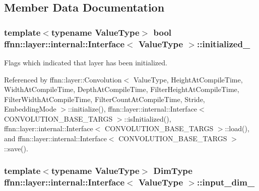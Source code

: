 \subsection{Member Data Documentation}
\hypertarget{classffnn_1_1layer_1_1internal_1_1_interface_a48c80e6608e9e20dfe2665abd55cd7ba}{
\subsubsection[{initialized\-\_\-}]{\setlength{\rightskip}{0pt plus 5cm}template$<$typename Value\-Type$>$ bool {\bf ffnn\-::layer\-::internal\-::\-Interface}$<$ Value\-Type $>$\-::initialized\-\_\-\hspace{0.3cm}{\ttfamily [protected]}}}\label{classffnn_1_1layer_1_1internal_1_1_interface_a48c80e6608e9e20dfe2665abd55cd7ba}


Flags which indicated that layer has been initialized. 



Referenced by ffnn\-::layer\-::\-Convolution$<$ Value\-Type, Height\-At\-Compile\-Time, Width\-At\-Compile\-Time, Depth\-At\-Compile\-Time, Filter\-Height\-At\-Compile\-Time, Filter\-Width\-At\-Compile\-Time, Filter\-Count\-At\-Compile\-Time, Stride, Embedding\-Mode $>$\-::initialize(), ffnn\-::layer\-::internal\-::\-Interface$<$ C\-O\-N\-V\-O\-L\-U\-T\-I\-O\-N\-\_\-\-B\-A\-S\-E\-\_\-\-T\-A\-R\-G\-S $>$\-::is\-Initialized(), ffnn\-::layer\-::internal\-::\-Interface$<$ C\-O\-N\-V\-O\-L\-U\-T\-I\-O\-N\-\_\-\-B\-A\-S\-E\-\_\-\-T\-A\-R\-G\-S $>$\-::load(), and ffnn\-::layer\-::internal\-::\-Interface$<$ C\-O\-N\-V\-O\-L\-U\-T\-I\-O\-N\-\_\-\-B\-A\-S\-E\-\_\-\-T\-A\-R\-G\-S $>$\-::save().

\hypertarget{classffnn_1_1layer_1_1internal_1_1_interface_aa011c369e00d2b78a87b94904e596f15}{
\subsubsection[{input\-\_\-dim\-\_\-}]{\setlength{\rightskip}{0pt plus 5cm}template$<$typename Value\-Type$>$ {\bf Dim\-Type} {\bf ffnn\-::layer\-::internal\-::\-Interface}$<$ Value\-Type $>$\-::input\-\_\-dim\-\_\-\hspace{0.3cm}{\ttfamily [protected]}}}\label{classffnn_1_1layer_1_1internal_1_1_interface_aa011c369e00d2b78a87b94904e596f15}


